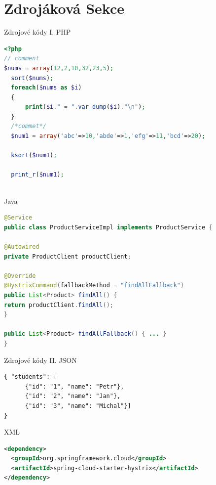 \documentclass{beamer}
\begin{document}
\section{Zdrojáková Sekce}
\begin{frame}[fragile, shrink=20]{Zdrojové kódy I.}
	PHP
	\begin{lstlisting}[language=PHP]
<?php
// comment
$nums = array(12,2,10,32,23,5);
  sort($nums);
  foreach($nums as $i)
  {
      print($i." = ".var_dump($i)."\n");
  }
  /*commet*/
  $num1 = array('abc'=>10,'abde'=>1,'efg'=>11,'bcd'=>20);
  
  ksort($num1);
  
  print_r($num1);
     
\end{lstlisting}

	Java
	\begin{lstlisting}[language=Java]
@Service
public class ProductServiceImpl implements ProductService {

@Autowired
private ProductClient productClient;

@Override
@HystrixCommand(fallbackMethod = "findAllFallback")
public List<Product> findAll() {
return productClient.findAll();
}

public List<Product> findAllFallback() { ... }
}
\end{lstlisting}
\end{frame}
\begin{frame}[fragile, shrink=20]{Zdrojové kódy II.}
	JSON

	\begin{lstlisting}[language=XML]
{ "students": [
      {"id": "1", "name": "Petr"},
      {"id": "2", "name": "Jan"},
      {"id": "3", "name": "Michal"}]
}
\end{lstlisting}

	XML
	\begin{lstlisting}[language=XML]
<dependency>
  <groupId>org.springframework.cloud</groupId>
  <artifactId>spring-cloud-starter-hystrix</artifactId>
</dependency>
\end{lstlisting}
\end{frame}
\end{document}
